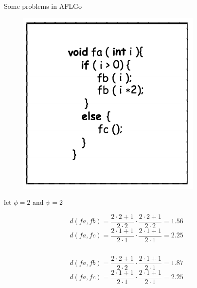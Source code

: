 \documentclass[10pt,aspectratio=43]{beamer}
\begin{document}
\begin{frame}{Some problems in AFLGo}
{\begin{figure}[htb]
\begin{minipage}[b]{0.45\linewidth}
            \end{minipage}
            \begin{minipage}[b]{0.45\linewidth}
                \includegraphics[width=0.8\linewidth]{pic/code2.pdf}
            \end{minipage}
        \end{figure}  
        let $\phi=2$ and $\psi=2$ \\
        \small{
            \begin{minipage}[b]{0.485\linewidth}
                $$d(fa,fb)=\frac{2\cdot 2+1}{2\cdot 2} \cdot \frac{2\cdot 2+1}{2\cdot 2} = 1.56$$
                $$d(fa,fc)=\frac{2\cdot 1+1}{2\cdot 1} \cdot \frac{2\cdot 1+1}{2\cdot 1} = 2.25$$
            \end{minipage}
            \begin{minipage}[b]{0.05\linewidth}
                $$ $$
            \end{minipage}
            \begin{minipage}[b]{0.485\linewidth}
                $$d(fa,fb)=\frac{2\cdot 2+1}{2\cdot 2} \cdot \frac{2\cdot 1+1}{2\cdot 1} = 1.87$$
                $$d(fa,fc)=\frac{2\cdot 1+1}{2\cdot 1} \cdot \frac{2\cdot 1+1}{2\cdot 1} = 2.25$$ 
            \end{minipage} 
        }
    }
\end{frame}
\end{document}
